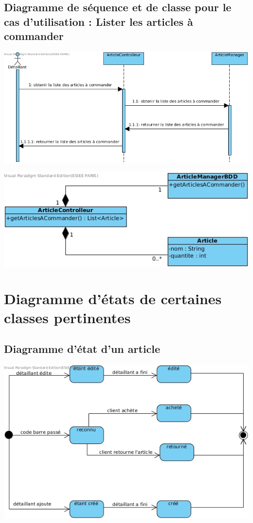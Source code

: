 \subsection{Diagramme de séquence et de classe pour le cas d'utilisation : Lister les articles à commander}
\begin{center}
	\includegraphics[width=14cm]{Analyse/DiagrammeSequenceListerArticlesACommander.jpg}
\end{center}
\begin{center}
	\includegraphics[width=14cm]{Analyse/DiagrammeDeClasseListerArticlesACommander.jpg}
\end{center}


\section{Diagramme d'états de certaines classes pertinentes}

\subsection{Diagramme d'état d'un article}
\begin{center}
	\includegraphics[width=14cm]{Analyse/DiagrammeEtatArticle.jpg}
\end{center}

